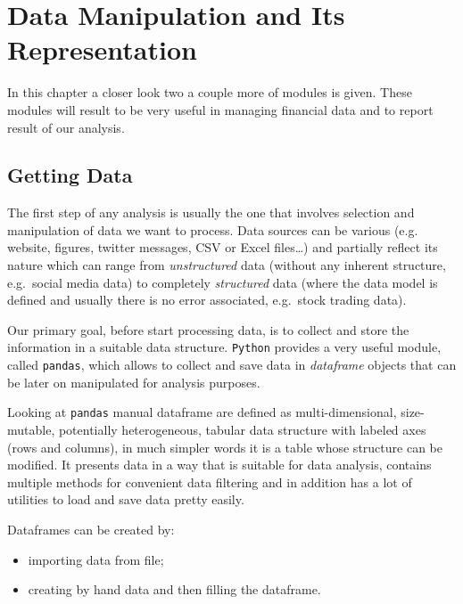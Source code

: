 \chapter{Data Manipulation and Its Representation}

In this chapter a closer look two a couple more of modules is given. These modules will result to be very useful in managing financial data and to report result of our analysis.

\section{Getting Data}\label{getting-data}

The first step of any analysis is usually the one that involves selection and manipulation of data we want to process. Data sources can be various (e.g. website, figures, twitter messages, CSV or Excel files\ldots{}) and partially reflect its nature which can range from \emph{unstructured} data (without any inherent structure, e.g.~social media data) to completely \emph{structured} data (where the data model is defined and usually there is no error associated, e.g.~stock trading data).

Our primary goal, before start processing data, is to collect and store the information in a suitable data structure. \texttt{Python} provides a very useful module, called \texttt{pandas}, which allows to collect and save data in \emph{dataframe} objects that can be later on manipulated for analysis purposes.

Looking at \texttt{pandas} manual dataframe are defined as multi-dimensional, size-mutable, potentially heterogeneous, tabular data structure with labeled axes (rows and columns), in much simpler words it is a table whose structure can be modified.
It presents data in a way that is suitable for data analysis, contains multiple methods for convenient data filtering and in addition has a lot of utilities to load and save data pretty easily.

Dataframes can be created by:
\begin{itemize}
\item importing data from file;
\item creating by hand data and then filling the dataframe.
\end{itemize}


